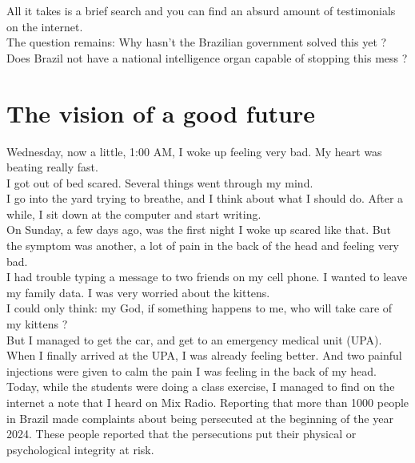 \documentclass[11pt]{book}
\begin{document}
\noindent All it takes is a brief search and you can find an absurd amount of testimonials on the internet. \\

\noindent The question remains: Why hasn't the Brazilian government solved this yet ? \\

\noindent Does Brazil not have a national intelligence organ capable of stopping this mess ?

\chapter{The vision of a good future}

\noindent Wednesday, now a little, 1:00 AM, I woke up feeling very bad. My heart was beating really fast. \\

\noindent I got out of bed scared. Several things went through my mind. \\

\noindent I go into the yard trying to breathe, and I think about what I should do. After a while, I sit down at the computer and start writing. \\

\noindent On Sunday, a few days ago, was the first night I woke up scared like that. But the symptom was another, a lot of pain in the back of the head and feeling very bad. \\

\noindent I had trouble typing a message to two friends on my cell phone. I wanted to leave my family data. I was very worried about the kittens. \\

\noindent I could only think: my God, if something happens to me, who will take care of my kittens ? \\

\noindent But I managed to get the car, and get to an emergency medical unit (UPA). \\

\noindent When I finally arrived at the UPA, I was already feeling better. And two painful injections were given to calm the pain I was feeling in the back of my head. \\

\noindent Today, while the students were doing a class exercise, I managed to find on the internet a note that I heard on Mix Radio. Reporting that more than 1000 people in Brazil made complaints about being persecuted at the beginning of the year 2024. These people reported that the persecutions put their physical or psychological integrity at risk. \\
\end{document}
